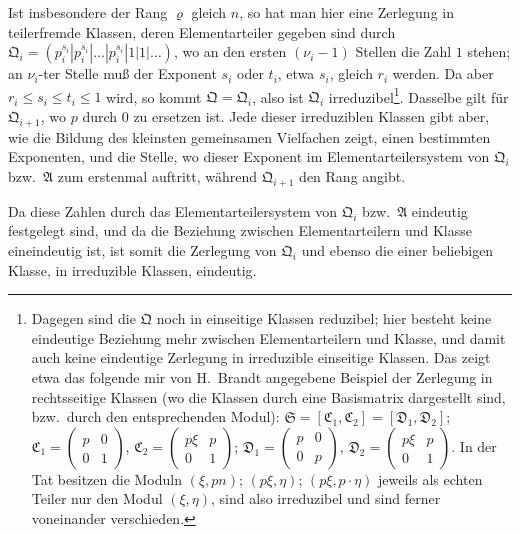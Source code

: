 \documentclass[fontsize=10pt,paper=a5,pagesize,headings=small]{scrbook}
\newcommand{\ideal}[1]{\mathfrak{#1}}
\theoremstyle{plain}
\begin{document}
Ist insbesondere der Rang $\varrho$ gleich $n$, so hat man hier eine Zerlegung
in teilerfremde Klassen, deren Elementarteiler gegeben sind durch
$\ideal{Q}_i = (p^{s_i}_i|p^{s_i}_i|\dots|p^{s_i}_i|1|1|\dots)$, wo an den ersten $(\nu_i-1)$ Stellen
die Zahl $1$ stehen; an $\nu_i$-ter Stelle muß der Exponent $s_i$ oder $t_i$,
etwa $s_i$, gleich $r_i$ werden. Da aber $r_i \leq s_i \leq t_i \leq 1$ wird,
so kommt $\ideal{Q} = \ideal{Q}_i$, also ist $\ideal{Q}_i$ irreduzibel\footnote{Dagegen
sind die $\ideal{Q}$ noch in einseitige Klassen reduzibel; hier besteht keine
eindeutige Beziehung mehr zwischen Elementarteilern und Klasse, und damit
auch keine eindeutige Zerlegung in irreduzible einseitige Klassen. Das zeigt
etwa das folgende mir von H.~Brandt angegebene Beispiel der Zerlegung in
rechtsseitige Klassen (wo die Klassen durch eine Basismatrix dargestellt sind,
bzw.~durch den entsprechenden Modul):
$\ideal{S} = [\ideal{C}_1, \ideal{C}_2] = [\ideal{D}_1, \ideal{D}_2]$;
$\ideal{C}_1 = \begin{pmatrix} p & 0 \\ 0 & 1 \end{pmatrix}$,
$\ideal{C}_2 = \begin{pmatrix} p\xi & p \\ 0 & 1 \end{pmatrix}$;
$\ideal{D}_1 = \begin{pmatrix} p & 0 \\ 0 & p \end{pmatrix}$,
$\ideal{D}_2 = \begin{pmatrix} p\xi & p \\ 0 & 1 \end{pmatrix}$.
In der Tat besitzen die Moduln $(\xi, pn)$; $(p\xi, \eta)$; $(p\xi, p\cdot\eta)$
jeweils als echten Teiler nur den Modul $(\xi, \eta)$, sind also irreduzibel und
sind ferner voneinander verschieden.}. Dasselbe gilt für $\ideal{Q}_{i+1}$,
wo $p$ durch $0$ zu ersetzen ist. Jede dieser irreduziblen Klassen gibt
aber, wie die Bildung des kleinsten gemeinsamen Vielfachen zeigt, einen
bestimmten Exponenten, und die Stelle, wo dieser Exponent im Elementar\-teilersystem
von $\ideal{Q}_i$ bzw.~$\ideal{A}$ zum erstenmal auftritt, während $\ideal{Q}_{i+1}$
den Rang angibt.

Da diese Zahlen durch das Elementarteilersystem von $\ideal{Q}_i$ bzw.~$\ideal{A}$
eindeutig festgelegt sind, und da die Beziehung zwischen Elementarteilern
und Klasse eineindeutig ist, ist somit die Zerlegung von $\ideal{Q}_i$ und ebenso
die einer beliebigen Klasse, in irreduzible Klassen, eindeutig.
\end{document}
